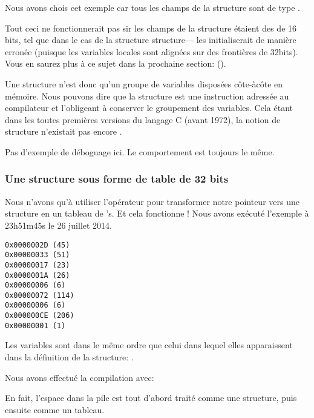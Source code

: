 Nous avons chois cet exemple car tous les champs de la structure sont de type \Tint.%

Tout ceci ne fonctionnerait pas sir les champs de la structure étaient des  de 16 bits, tel 
que dans le cas de la structure  structure--- les initialiserait 
de manière erronée (puisque les variables locales sont alignées sur des frontières de 32bits).
Vous en saurez plus à ce sujet dans la prochaine section: 
\q{\StructurePackingSectionName} ().

Une structure n'est donc qu'un groupe de variables disposées côte-àcôte en mémoire. Nous pouvons 
dire que la structure est une instruction adressée au compilateur et l'obligeant à conserver le 
groupement des variables.
Cela étant dans les toutes premières versions du langage C (avant 1972), la notion de structure 
n'existait pas encore \RitchieDevC.

Pas d'exemple de déboguage ici. Le comportement est toujours le même.

\subsubsection{Une structure sous forme de table de 32 bits}



Nous n'avons qu'à utiliser l'opérateur  pour transformer notre pointeur vers une structure 
en un tableau de \Tint{}'s. Et cela fonctionne !
Nous avons exécuté l'exemple à 23h51m45s le 26 juillet 2014.

\begin{lstlisting}[label=GCC_tm3_output]
0x0000002D (45)
0x00000033 (51)
0x00000017 (23)
0x0000001A (26)
0x00000006 (6)
0x00000072 (114)
0x00000006 (6)
0x000000CE (206)
0x00000001 (1)
\end{lstlisting}

Les variables sont dans le même ordre que celui dans lequel elles apparaissent dans la définition 
de la structure: .

Nous avons effectué la compilation avec:



En fait, l'espace dans la pile est tout d'abord traité comme une structure, puis ensuite comme un 
tableau.

